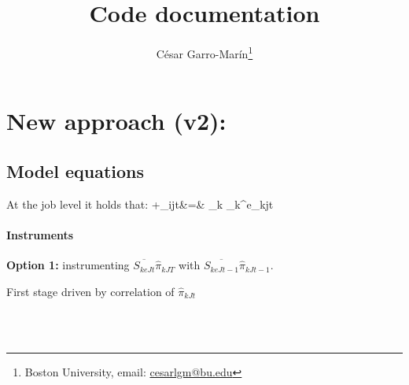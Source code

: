 \documentclass[a4paper, 12pt]{article}
\title{Code documentation}
\author{C\'esar Garro-Mar\'in\thanks{Boston University, email: \href{mailto:cesarlgm@bu.edu}{cesarlgm@bu.edu}}}
\begin{document}
	\maketitle
	

	\section{New approach (v2):}
	\subsection{Model equations}
	At the job level it holds that:
	\beqn
	\Delta {}+\hat{\pi}_{ijt}&=& \sum_k \theta_k^e\hat{\pi}_{kjt}\label{eq:pi_equation}
	\eeqn
	\paragraph{Instruments}
	\bitem
		\item \textbf{Option 1:} instrumenting $\overline{S_{keJt}}\hat{\pi}_{kJT}$ with $\overline{S_{keJt-1}}\hat{\pi}_{kJt-1}$.
	
		First stage driven by correlation of $\hat{\pi}_{kJt}$
		
		
		\\
		\\
		
	\eitem 
		
		
	
\end{document}
